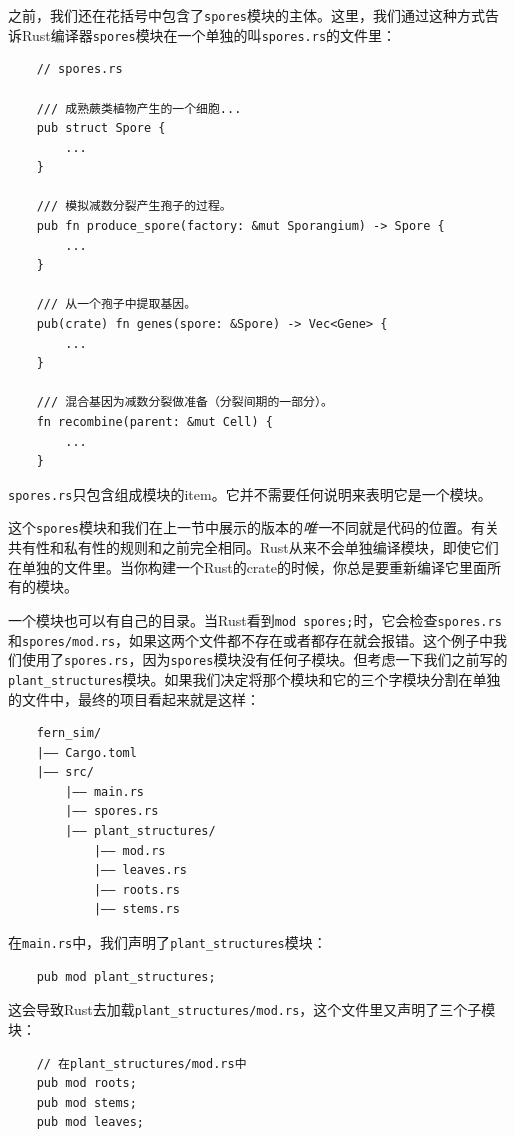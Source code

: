 之前，我们还在花括号中包含了\texttt{spores}模块的主体。这里，我们通过这种方式告诉Rust编译器\texttt{spores}模块在一个单独的叫\texttt{spores.rs}的文件里：
\begin{verbatim}
    // spores.rs

    /// 成熟蕨类植物产生的一个细胞...
    pub struct Spore {
        ...
    }

    /// 模拟减数分裂产生孢子的过程。
    pub fn produce_spore(factory: &mut Sporangium) -> Spore {
        ...
    }

    /// 从一个孢子中提取基因。
    pub(crate) fn genes(spore: &Spore) -> Vec<Gene> {
        ...
    }

    /// 混合基因为减数分裂做准备（分裂间期的一部分）。
    fn recombine(parent: &mut Cell) {
        ...
    }
\end{verbatim}

\texttt{spores.rs}只包含组成模块的item。它并不需要任何说明来表明它是一个模块。

这个\texttt{spores}模块和我们在上一节中展示的版本的\emph{唯一}不同就是代码的位置。有关共有性和私有性的规则和之前完全相同。Rust从来不会单独编译模块，即使它们在单独的文件里。当你构建一个Rust的crate的时候，你总是要重新编译它里面所有的模块。

一个模块也可以有自己的目录。当Rust看到\texttt{mod spores;}时，它会检查\texttt{spores.rs}和\texttt{spores/mod.rs}，如果这两个文件都不存在或者都存在就会报错。这个例子中我们使用了\texttt{spores.rs}，因为\texttt{spores}模块没有任何子模块。但考虑一下我们之前写的\texttt{plant\_structures}模块。如果我们决定将那个模块和它的三个字模块分割在单独的文件中，最终的项目看起来就是这样：
\begin{verbatim}
    fern_sim/
    |—— Cargo.toml
    |—— src/
        |—— main.rs
        |—— spores.rs
        |—— plant_structures/
            |—— mod.rs
            |—— leaves.rs
            |—— roots.rs
            |—— stems.rs
\end{verbatim}

在\texttt{main.rs}中，我们声明了\texttt{plant\_structures}模块：
\begin{verbatim}
    pub mod plant_structures;
\end{verbatim}

这会导致Rust去加载\texttt{plant\_structures/mod.rs}，这个文件里又声明了三个子模块：
\begin{verbatim}
    // 在plant_structures/mod.rs中
    pub mod roots;
    pub mod stems;
    pub mod leaves;
\end{verbatim}


